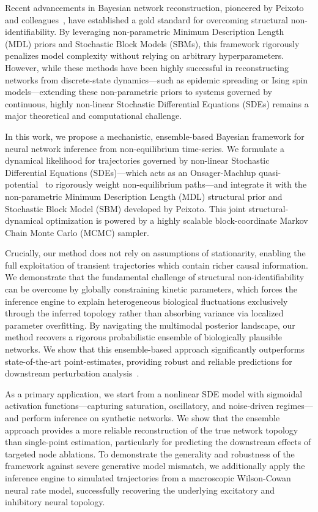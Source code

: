 \documentclass[10pt, aps, rmp,  twocolumn, superscriptaddress, floatfix, showkeys]{revtex4-2}
\begin{document}
Recent advancements in Bayesian network reconstruction, pioneered by Peixoto and colleagues~\cite{peixoto2019network, peixoto2025network}, have established a gold standard for overcoming structural non-identifiability. By leveraging non-parametric Minimum Description Length (MDL) priors and Stochastic Block Models (SBMs), this framework rigorously penalizes model complexity without relying on arbitrary hyperparameters. However, while these methods have been highly successful in reconstructing networks from discrete-state dynamics---such as epidemic spreading or Ising spin models---extending these non-parametric priors to systems governed by continuous, highly non-linear Stochastic Differential Equations (SDEs) remains a major theoretical and computational challenge.

In this work, we propose a mechanistic, ensemble-based Bayesian framework for neural network inference from non-equilibrium time-series. We formulate a dynamical likelihood for trajectories governed by non-linear Stochastic Differential Equations (SDEs)---which acts as an Onsager-Machlup quasi-potential~\cite{onsager1953fluctuations} to rigorously weight non-equilibrium paths---and integrate it with the non-parametric Minimum Description Length (MDL) structural prior and Stochastic Block Model (SBM) developed by Peixoto. This joint structural-dynamical optimization is powered by a highly scalable block-coordinate Markov Chain Monte Carlo (MCMC) sampler.

Crucially, our method does not rely on assumptions of stationarity, enabling the full exploitation of transient trajectories which contain richer causal information. We demonstrate that the fundamental challenge of structural non-identifiability can be overcome by globally constraining kinetic parameters, which forces the inference engine to explain heterogeneous biological fluctuations exclusively through the inferred topology rather than absorbing variance via localized parameter overfitting. By navigating the multimodal posterior landscape, our method recovers a rigorous probabilistic ensemble of biologically plausible networks. We show that this ensemble-based approach significantly outperforms state-of-the-art point-estimates, providing robust and reliable predictions for downstream perturbation analysis~\cite{peel2022statistical}.

As a primary application, we start from a nonlinear SDE model with sigmoidal activation functions---capturing saturation, oscillatory, and noise-driven regimes---and perform inference on synthetic networks. We show that the ensemble approach provides a more reliable reconstruction of the true network topology than single-point estimation, particularly for predicting the downstream effects of targeted node ablations. To demonstrate the generality and robustness of the framework against severe generative model mismatch, we additionally apply the inference engine to simulated trajectories from a macroscopic Wilson-Cowan neural rate model, successfully recovering the underlying excitatory and inhibitory neural topology.
\end{document}
